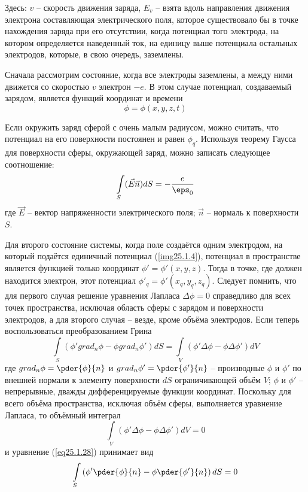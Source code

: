 Здесь: \( v \) -- скорость движения заряда, \( E_v \) -- взята вдоль 
направления движения электрона составляющая электрического поля, которое 
существовало бы в точке нахождения заряда при его отсутствии, когда 
потенциал того электрода, на котором определяется наведенный ток, на единицу 
выше потенциала остальных электродов, которые, в свою очередь, заземлены.

Сначала рассмотрим состояние, когда все электроды заземлены, а между ними 
движется со скоростью \( v \) электрон \( -e \). В этом случае потенциал, 
создаваемый зарядом, является функций координат и времени
\[
	\phi = \phi( x, y, z, t )
\]

Если окружить заряд сферой с очень малым радиусом, можно считать, что 
потенциал на его поверхности постоянен и равен \( \phi_q \). Используя 
теорему Гаусса для поверхности сферы, окружающей заряд, можно записать 
следующее соотношение:
\[
	\int\limits_S (\vec{E}\vec{n}) dS = -\frac{e}{\eps_0}
\]
где \( \vec{E} \) -- вектор напряженности электрического поля; 
\( \vec{n} \) -- нормаль к поверхности \( S \).

Для второго состояние системы, когда поле создаётся одним электродом, на 
который подаётся единичный потенциал (\ref{img25.1.4}), потенциал в 
пространстве является функцией только координат 
\( \phi' = \phi'( x, y, z ) \). Тогда в точке, где должен находится электрон, 
этот потенциал \( \phi'_q = \phi'( x_q, y_q, z_q ) \). Следует помнить, что  
для первого случая решение уравнения Лапласа \( \Delta\phi = 0 \) справедливо 
для всех точек пространства, исключая область сферы с зарядом и поверхности 
электродов, а для второго случая -- везде, кроме объёма электродов. Если 
теперь воспользоваться преобразованием Грина
\begin{equation}
	\int\limits_S (\phi' grad_n\phi - \phi grad_n\phi') dS = 
		\int\limits_V (\phi'\Delta\phi - \phi\Delta\phi') dV
	\label{eq25.1.28}
\end{equation}
где \(  grad_n\phi = \pder{\phi}{n} \) и 
\(  grad_n\phi' = \pder{\phi'}{n} \) -- производные \( \phi \) и \( \phi' \) 
по внешней нормали к элементу поверхности \( dS \) ограничивающей объём 
\( V \); \( \phi \) и \( \phi' \) -- непрерывные, дважды дифференцируемые 
функции координат. Поскольку для всего объёма пространства, исключая объём 
сферы, выполняется уравнение Лапласа, то объёмный интеграл
\[
	\int\limits_V (\phi'\Delta\phi - \phi\Delta\phi') dV = 0
\]
и уравнение (\ref{eq25.1.28}) принимает вид
\begin{equation}
	\int\limits_S \left(
		\phi'\pder{\phi}{n} - \phi\pder{\phi'}{n}
	\right) dS = 0
	\label{eq25.1.29}
\end{equation}

